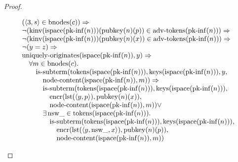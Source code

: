 \documentclass[11pt]{article}
\theoremstyle{plain}
\begin{document}
\begin{proof}
\begin{itemize}[leftmargin=2.8em, itemsep=4pt, parsep=1pt]
\begin{itemize}[leftmargin=2.8em, itemsep=4pt, parsep=1pt]
\begin{equation*}
\begin{array}{@{}l@{}}
\begin{array}{@{}l@{}} (\langle 3, s \rangle \in \operatorname{bnodes}(c)) \Rightarrow  \\ \neg (\operatorname{kinv}(\operatorname{ispace}(\operatorname{pk\text{-}inf}(n)))(\operatorname{pubkey}(n)(p)) \in \operatorname{adv\text{-}tokens}(\operatorname{pk\text{-}inf}(n))) \Rightarrow  \\ \neg (\operatorname{kinv}(\operatorname{ispace}(\operatorname{pk\text{-}inf}(n)))(\operatorname{pubkey}(n)(x)) \in \operatorname{adv\text{-}tokens}(\operatorname{pk\text{-}inf}(n))) \Rightarrow  \\ \neg (y = z) \Rightarrow  \\ \operatorname{uniquely\text{-}originates}(\operatorname{ispace}(\operatorname{pk\text{-}inf}(n)), y) \Rightarrow  \\ \quad \forall m \in \operatorname{bnodes}(c). \\ \quad \quad \operatorname{is\text{-}subterm}(\operatorname{tokens}(\operatorname{ispace}(\operatorname{pk\text{-}inf}(n))), \operatorname{keys}(\operatorname{ispace}(\operatorname{pk\text{-}inf}(n))), y, \\ \quad \quad \quad \operatorname{node\text{-}content}(\operatorname{ispace}(\operatorname{pk\text{-}inf}(n)), m)) \Rightarrow \\ \quad \quad \quad \operatorname{is\text{-}subterm}(\operatorname{tokens}(\operatorname{ispace}(\operatorname{pk\text{-}inf}(n))), \operatorname{keys}(\operatorname{ispace}(\operatorname{pk\text{-}inf}(n))), \\ \quad \quad \quad \quad \operatorname{encr}(\operatorname{lst}(\langle y, p \rangle), \operatorname{pubkey}(n)(x)), \\ \quad \quad \quad \quad \operatorname{node\text{-}content}(\operatorname{ispace}(\operatorname{pk\text{-}inf}(n)), m)) \vee \\ \quad \quad \quad \exists \operatorname{nsw\_} \in \operatorname{tokens}(\operatorname{ispace}(\operatorname{pk\text{-}inf}(n))). \\ \quad \quad \quad \quad \operatorname{is\text{-}subterm}(\operatorname{tokens}(\operatorname{ispace}(\operatorname{pk\text{-}inf}(n))), \operatorname{keys}(\operatorname{ispace}(\operatorname{pk\text{-}inf}(n))), \\ \quad \quad \quad \quad \quad \operatorname{encr}(\operatorname{lst}(\langle y, \operatorname{nsw\_}, x \rangle), \operatorname{pubkey}(n)(p)), \\ \quad \quad \quad \quad \quad \operatorname{node\text{-}content}(\operatorname{ispace}(\operatorname{pk\text{-}inf}(n)), m)) \end{array} \\

\end{array}
\end{equation*}
\end{itemize}
\end{itemize}
\end{proof}
\end{document}

